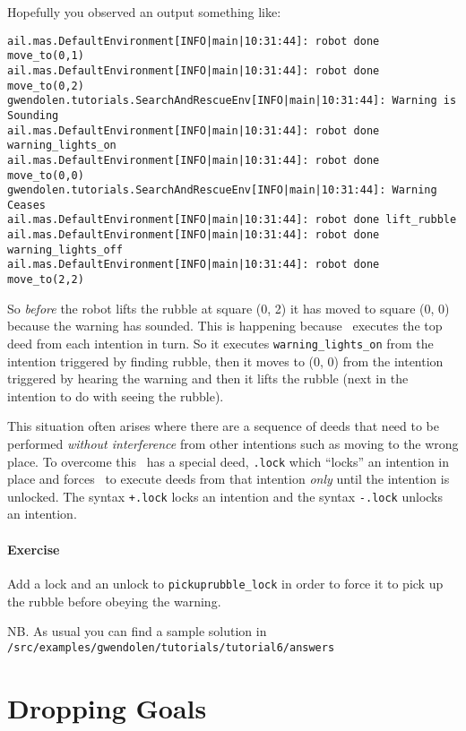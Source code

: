 \pagebreak

Hopefully you observed an output something like:
\begin{verbatim}
ail.mas.DefaultEnvironment[INFO|main|10:31:44]: robot done move_to(0,1) 
ail.mas.DefaultEnvironment[INFO|main|10:31:44]: robot done move_to(0,2) 
gwendolen.tutorials.SearchAndRescueEnv[INFO|main|10:31:44]: Warning is Sounding 
ail.mas.DefaultEnvironment[INFO|main|10:31:44]: robot done warning_lights_on 
ail.mas.DefaultEnvironment[INFO|main|10:31:44]: robot done move_to(0,0) 
gwendolen.tutorials.SearchAndRescueEnv[INFO|main|10:31:44]: Warning Ceases 
ail.mas.DefaultEnvironment[INFO|main|10:31:44]: robot done lift_rubble 
ail.mas.DefaultEnvironment[INFO|main|10:31:44]: robot done warning_lights_off 
ail.mas.DefaultEnvironment[INFO|main|10:31:44]: robot done move_to(2,2) 
\end{verbatim}
So \emph{before} the robot lifts the rubble at square (0, 2) it has moved to square (0, 0) because the warning has sounded.  This is happening because \gwendolen\ executes the top deed from each intention in turn.  So it executes \lstinline{warning_lights_on} from the intention triggered by finding rubble, then it moves to (0, 0) from the intention triggered by hearing the warning and then it lifts the rubble (next in the intention to do with seeing the rubble).

This situation often arises where there are a sequence of deeds that need to be performed \emph{without interference} from other intentions such as moving to the wrong place.  To overcome this \gwendolen\ has a special deed, \lstinline{.lock} which ``locks'' an intention in place and forces \gwendolen\ to execute deeds from that intention \emph{only} until the intention is unlocked.  The syntax \lstinline{+.lock} locks an intention and the syntax \lstinline{-.lock} unlocks an intention.

\paragraph{Exercise} Add a lock and an unlock to \verb+pickuprubble_lock+ in order to force it to pick up the rubble before obeying the warning.

\begin{sloppypar}
NB. As usual you can find a sample solution in \texttt{/src/examples/gwendolen/tutorials/tutorial6/answers}
\end{sloppypar}

\section{Dropping Goals}

